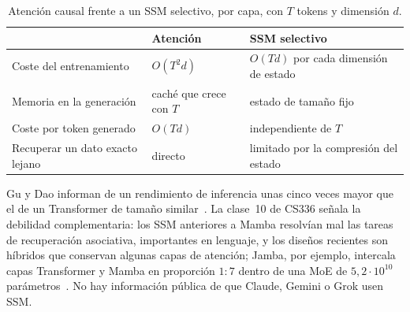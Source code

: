 \begin{table}[ht]
\centering\small
\caption{Atención causal frente a un SSM selectivo, por capa, con $T$ tokens y dimensión $d$.}\label{tab:ssm}
\begin{tabular}{@{}lll@{}}
\toprule
& Atención & SSM selectivo \\
\midrule
Coste del entrenamiento & $O(T^{2}d)$ & $O(Td)$ por cada dimensión de estado \\
Memoria en la generación & caché que crece con $T$ & estado de tamaño fijo \\
Coste por token generado & $O(Td)$ & independiente de $T$ \\
Recuperar un dato exacto lejano & directo & limitado por la compresión del estado \\
\bottomrule
\end{tabular}
\end{table}

Gu y Dao informan de un rendimiento de inferencia unas cinco veces mayor que el de un Transformer de tamaño similar~\cite[§4.5]{mamba}. La clase~10 de CS336 señala la debilidad complementaria: los SSM anteriores a Mamba resolvían mal las tareas de recuperación asociativa, importantes en lenguaje, y los diseños recientes son híbridos que conservan algunas capas de atención; Jamba, por ejemplo, intercala capas Transformer y Mamba en proporción $1:7$ dentro de una MoE de $5{,}2\cdot 10^{10}$ parámetros~\cite{cs336,jamba}. No hay información pública de que Claude, Gemini o Grok usen SSM.

